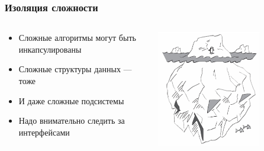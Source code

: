 \documentclass[xetex,mathserif,serif]{beamer}
\begin{document}
    \begin{frame}
        \frametitle{Изоляция сложности}
        \begin{columns}
            \begin{column}{0.6\textwidth}
                \begin{itemize}
                    \item Сложные алгоритмы могут быть инкапсулированы
                    \item Сложные структуры данных --- тоже
                    \item И даже сложные подсистемы
                    \item Надо внимательно следить за интерфейсами
                \end{itemize}
            \end{column}
            \begin{column}{0.4\textwidth}
                \includegraphics[width=0.7\textwidth]{complexity.png}
            \end{column}
        \end{columns}
    \end{frame}
\end{document}
